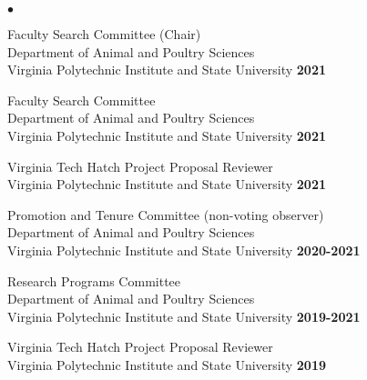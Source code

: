 \documentclass[margin,line,10pt]{res}
\newenvironment{list2}{
  \begin{list}{$\bullet$}{%
      \setlength{\itemsep}{0in}
      \setlength{\parsep}{0in} \setlength{\parskip}{0in}
      \setlength{\topsep}{0in} \setlength{\partopsep}{0in} 
      \setlength{\leftmargin}{0.2in}}}{\end{list}}
\begin{document}
\begin{resume}
\begin{list2}
  \vspace{0.3cm}

  \item Faculty Search Committee (Chair) \\
  Department of Animal and Poultry Sciences \\ Virginia Polytechnic Institute and State University   \hfill \textbf{2021}\\

  
  \vspace{0.3cm}

   \item  Faculty Search Committee \\
  Department of Animal and Poultry Sciences \\ Virginia Polytechnic Institute and State University   \hfill \textbf{2021}\\

      \vspace{0.3cm}
  

  \item  Virginia Tech Hatch Project Proposal Reviewer \\
  Virginia Polytechnic Institute and State University \hfill \textbf{2021}  \\

      \vspace{0.3cm}


\item Promotion and Tenure Committee (non-voting observer) \\
  Department of Animal and Poultry Sciences \\ Virginia Polytechnic Institute and State University   \hfill \textbf{2020-2021}\\

    \vspace{0.3cm}

  
\item Research Programs Committee \\
  Department of Animal and Poultry Sciences \\ Virginia Polytechnic Institute and State University  \hfill \textbf{2019-2021}\\

  
  \vspace{0.3cm}

  \item  Virginia Tech Hatch Project Proposal Reviewer \\
  Virginia Polytechnic Institute and State University \hfill \textbf{2019}  \\



\end{list2}
\end{resume}
\end{document}

